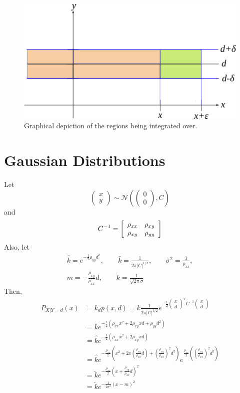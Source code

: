 \begin{figure}[ht!]
	\centering
	\includegraphics[width=.5\textwidth]{images/03deltaSpace}
	\caption{Graphical depiction of the regions being integrated over.}
	\label{fig:03deltaSpace}
\end{figure}

\section{Gaussian Distributions}
Let
$$\left(\begin{array}{c}x \\y\end{array}\right) \sim \mathcal{N}\left(\left(\begin{array}{c}0\\0\end{array}\right), C\right)$$
and
$$C^{-1} = \left[\begin{array}{c c} \rho_{xx} & \rho_{xy} \\ \rho_{xy} & \rho_{yy} \end{array}\right]$$
Also, let
\begin{align*}
\hat{k}=e^{-\frac{1}{2}\rho_{yy}d^2}, \qquad \bar{k}=\frac{1}{2\pi|C|^{1/2}},\qquad \sigma^2=\frac{1}{\rho_{xx}}, \\ m=-\frac{\rho_{xy}}{\rho_{xx}}d, \qquad \tilde{k}=\frac{1}{\sqrt{2\pi}\sigma}
\end{align*}
Then,
\begin{align*}
P_{X|Y=d}(x) &= k_dp(x,d) = k\frac{1}{2\pi|C|^{1/2}} e^{-\frac{1}{2}\left(\begin{array}{c}x\\d\end{array}\right)^TC^{-1} \left(\begin{array}{c}x\\d\end{array}\right)} \\
&= \bar{k}e^{-\frac{1}{2}\left(\rho_{xx}x^2+2\rho_{xy}xd+\rho_{yy}d^2\right)} \\
&= \hat{k}e^{-\frac{1}{2}\left(\rho_{xx}x^2+2\rho_{xy}xd\right)} \\
&= \hat{k}e^{-\frac{\rho_{xx}}{2}\left(x^2 + 2x(\frac{\rho_{xy}}{\rho_{xx}}d) + (\frac{\rho_{xy}}{\rho_{xx}})^2d^2\right)} e^{\frac{\rho_{xx}}{2}\left((\frac{\rho_{xy}}{\rho_{xx}})^2d^2\right)} \\
&= \tilde{k}e^{-\frac{\rho_{xx}}{2}\left(x+\frac{\rho_{xy}}{\rho_{xx}}d\right)^2} \\
&= \tilde{k}e^{-\frac{1}{2\sigma^2}\left(x-m\right)^2}
\end{align*}


